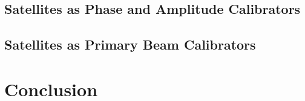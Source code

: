 \documentclass[preprint]{aastex}
\begin{document}
\subsection{Satellites as Phase and Amplitude Calibrators}\label{ssecphampsat}
\subsection{Satellites as Primary Beam Calibrators}\label{ssecpbcalsat}
\section{Conclusion}\label{secconc}



\end{document}
